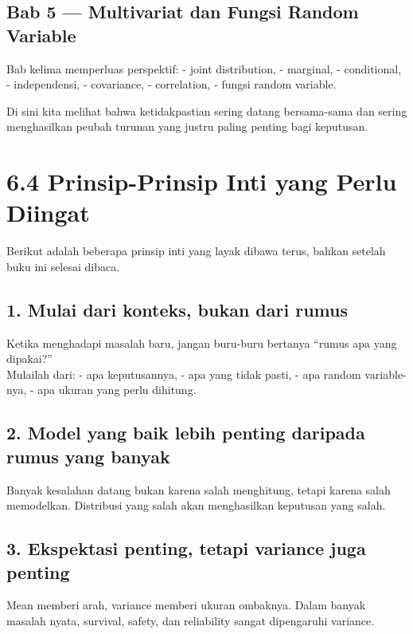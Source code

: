 \documentclass[
  letterpaper,
  DIV=11,
  numbers=noendperiod]{scrreprt}
\begin{document}
\subsection{Bab 5 --- Multivariat dan Fungsi Random
Variable}\label{bab-5-multivariat-dan-fungsi-random-variable}

Bab kelima memperluas perspektif: - joint distribution, - marginal, -
conditional, - independensi, - covariance, - correlation, - fungsi
random variable.

Di sini kita melihat bahwa ketidakpastian sering datang bersama-sama dan
sering menghasilkan peubah turunan yang justru paling penting bagi
keputusan.

\section{6.4 Prinsip-Prinsip Inti yang Perlu
Diingat}\label{prinsip-prinsip-inti-yang-perlu-diingat}

Berikut adalah beberapa prinsip inti yang layak dibawa terus, bahkan
setelah buku ini selesai dibaca.

\subsection{1. Mulai dari konteks, bukan dari
rumus}\label{mulai-dari-konteks-bukan-dari-rumus}

Ketika menghadapi masalah baru, jangan buru-buru bertanya ``rumus apa
yang dipakai?''\\
Mulailah dari: - apa keputusannya, - apa yang tidak pasti, - apa random
variable-nya, - apa ukuran yang perlu dihitung.

\subsection{2. Model yang baik lebih penting daripada rumus yang
banyak}\label{model-yang-baik-lebih-penting-daripada-rumus-yang-banyak}

Banyak kesalahan datang bukan karena salah menghitung, tetapi karena
salah memodelkan. Distribusi yang salah akan menghasilkan keputusan yang
salah.

\subsection{3. Ekspektasi penting, tetapi variance juga
penting}\label{ekspektasi-penting-tetapi-variance-juga-penting}

Mean memberi arah, variance memberi ukuran ombaknya. Dalam banyak
masalah nyata, survival, safety, dan reliability sangat dipengaruhi
variance.
\end{document}
